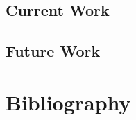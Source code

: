 \documentclass{article}
\begin{document}
\subsection{Current Work}

\subsection{Future Work}



\section{Bibliography}
\end{document}
